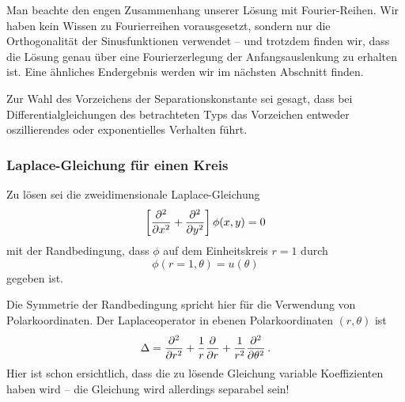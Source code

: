 \documentclass[paper=a4, fontsize=11.0pt, abstractoff, DIV12]{scrartcl}
\begin{document}
Man beachte den engen Zusammenhang unserer Lösung mit Fourier-Reihen. Wir
haben kein Wissen zu Fourierreihen vorausgesetzt, sondern nur die
Orthogonalität der Sinusfunktionen verwendet -- und trotzdem finden wir,
dass die Lösung genau über eine Fourierzerlegung der Anfangsauslenkung zu
erhalten ist. Eine ähnliches Endergebnis werden wir im nächsten Abschnitt
finden.

Zur Wahl des Vorzeichens der Separationskonstante sei gesagt, dass bei
Differentialgleichungen des betrachteten Typs das Vorzeichen entweder
oszillierendes oder exponentielles Verhalten führt.

\subsubsection{Laplace-Gleichung für einen Kreis}

Zu lösen sei die zweidimensionale Laplace-Gleichung
\begin{equation}
\left[\frac{\partial^2 }{\partial {x}^2} + \frac{\partial^2 }{\partial {y}^2}\right] \phi(x,y) = 0
\end{equation}
mit der Randbedingung, dass $\phi$ auf dem Einheitskreis $r=1$ durch
\begin{equation}
\phi(r=1, \theta) = u(\theta)
\label{eq:LaplaeRB}
\end{equation}
gegeben ist.

Die Symmetrie der Randbedingung spricht hier für die Verwendung von
Polarkoordinaten. Der Laplaceoperator in ebenen Polarkoordinaten $(r, \theta)$ ist
\begin{equation}
\Delta = \frac{\partial^2 }{\partial {r}^2}+\frac{1}{r}\frac{\partial }{\partial r} + \frac{1}{r^2}\frac{\partial^2 }{\partial {\theta}^2}\,.
\end{equation}
Hier ist schon ersichtlich, dass die zu lösende Gleichung variable Koeffizienten
haben wird -- die Gleichung wird allerdings separabel sein!
\end{document}
